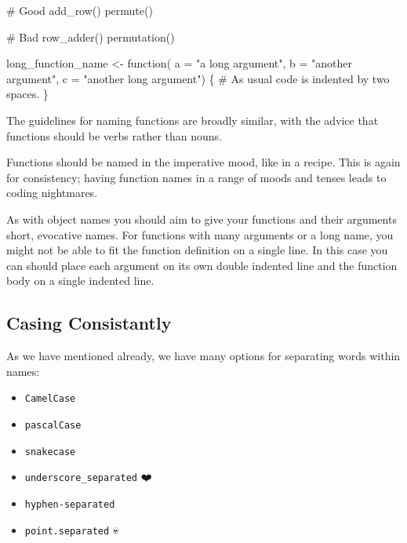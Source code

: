 \documentclass[
  letterpaper,
  DIV=11,
  numbers=noendperiod]{scrreprt}
\newenvironment{Shaded}{\begin{snugshade}}{\end{snugshade}}
\newcommand{\AttributeTok}[1]{\textcolor[rgb]{0.40,0.45,0.13}{#1}}
\newcommand{\CommentTok}[1]{\textcolor[rgb]{0.37,0.37,0.37}{#1}}
\newcommand{\ControlFlowTok}[1]{\textcolor[rgb]{0.00,0.23,0.31}{#1}}
\newcommand{\FunctionTok}[1]{\textcolor[rgb]{0.28,0.35,0.67}{#1}}
\newcommand{\NormalTok}[1]{\textcolor[rgb]{0.00,0.23,0.31}{#1}}
\newcommand{\OtherTok}[1]{\textcolor[rgb]{0.00,0.23,0.31}{#1}}
\newcommand{\StringTok}[1]{\textcolor[rgb]{0.13,0.47,0.30}{#1}}
\providecommand{\tightlist}{%
  \setlength{\itemsep}{0pt}\setlength{\parskip}{0pt}}\usepackage{longtable,booktabs,array}
\begin{document}
\begin{Shaded}
\begin{Highlighting}[]
\CommentTok{\# Good}
\FunctionTok{add\_row}\NormalTok{()}
\FunctionTok{permute}\NormalTok{()}

\CommentTok{\# Bad}
\FunctionTok{row\_adder}\NormalTok{()}
\FunctionTok{permutation}\NormalTok{()}

\NormalTok{long\_function\_name }\OtherTok{\textless{}{-}} \ControlFlowTok{function}\NormalTok{(}
    \AttributeTok{a =} \StringTok{"a long argument"}\NormalTok{,}
    \AttributeTok{b =} \StringTok{"another argument"}\NormalTok{,}
    \AttributeTok{c =} \StringTok{"another long argument"}\NormalTok{) \{}
  \CommentTok{\# As usual code is indented by two spaces.}
\NormalTok{\}}
\end{Highlighting}
\end{Shaded}

The guidelines for naming functions are broadly similar, with the advice
that functions should be verbs rather than nouns.

Functions should be named in the imperative mood, like in a recipe. This
is again for consistency; having function names in a range of moods and
tenses leads to coding nightmares.

As with object names you should aim to give your functions and their
arguments short, evocative names. For functions with many arguments or a
long name, you might not be able to fit the function definition on a
single line. In this case you can should place each argument on its own
double indented line and the function body on a single indented line.

\subsection{Casing Consistantly}\label{casing-consistantly}

As we have mentioned already, we have many options for separating words
within names:

\begin{itemize}
\tightlist
\item
  \texttt{CamelCase}
\item
  \texttt{pascalCase}
\item
  \texttt{snakecase}
\item
  \texttt{underscore\_separated} ❤️
\item
  \texttt{hyphen-separated}
\item
  \texttt{point.separated} 💀
\end{itemize}
\end{document}
